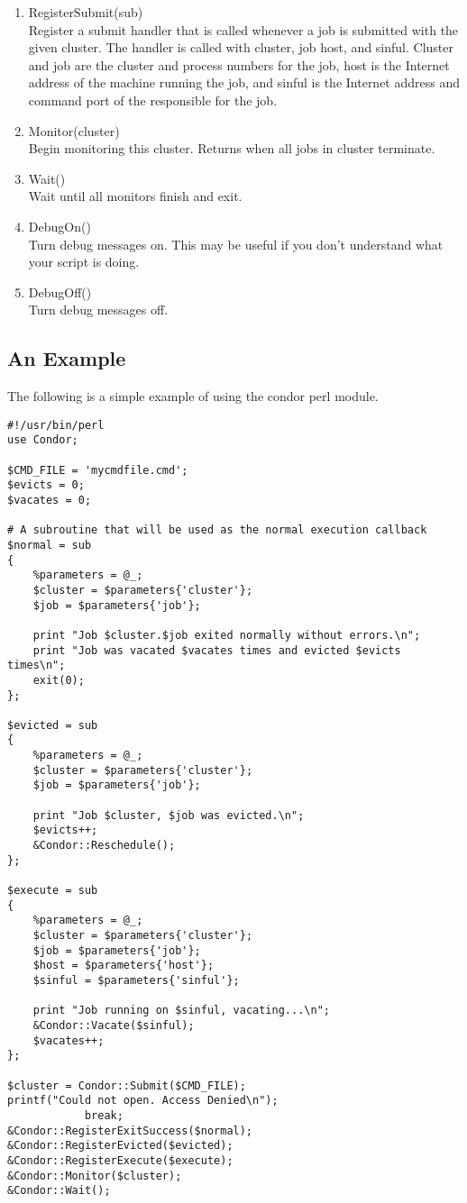 \begin{enumerate}
	\item RegisterSubmit(sub) \\
	Register a submit handler that is called whenever a job is submitted
	with the given cluster.  The handler is called with cluster, job 
	host, and sinful. Cluster and job are the cluster and
	process numbers for the job, host is the Internet address of the
	machine running the job, and sinful is the Internet address and
	command port of the  responsible for the job.

	\item Monitor(cluster) \\
	Begin monitoring this cluster. Returns when all jobs in cluster
	terminate.  \\
	
	\item Wait() \\
	Wait until all monitors finish and exit.

	\item DebugOn() \\
	Turn debug messages on.  This may be useful if you don't understand
	what your script is doing.	

	\item DebugOff() \\
	Turn debug messages off.

\end{enumerate}

\subsection{An Example}
The following is a simple example of using the condor perl module.
\begin{verbatim}
#!/usr/bin/perl
use Condor;

$CMD_FILE = 'mycmdfile.cmd';
$evicts = 0;
$vacates = 0;

# A subroutine that will be used as the normal execution callback
$normal = sub
{
    %parameters = @_;
    $cluster = $parameters{'cluster'};
    $job = $parameters{'job'};

    print "Job $cluster.$job exited normally without errors.\n";
    print "Job was vacated $vacates times and evicted $evicts times\n";
    exit(0);
};	

$evicted = sub
{
    %parameters = @_;
    $cluster = $parameters{'cluster'};
    $job = $parameters{'job'};

    print "Job $cluster, $job was evicted.\n";
    $evicts++;
    &Condor::Reschedule();	
};

$execute = sub
{
    %parameters = @_;
    $cluster = $parameters{'cluster'};
    $job = $parameters{'job'};
    $host = $parameters{'host'};
    $sinful = $parameters{'sinful'};

    print "Job running on $sinful, vacating...\n";
    &Condor::Vacate($sinful);
    $vacates++;
};

$cluster = Condor::Submit($CMD_FILE);
printf("Could not open. Access Denied\n");
			break;
&Condor::RegisterExitSuccess($normal);
&Condor::RegisterEvicted($evicted);
&Condor::RegisterExecute($execute);
&Condor::Monitor($cluster);
&Condor::Wait();
\end{verbatim}

